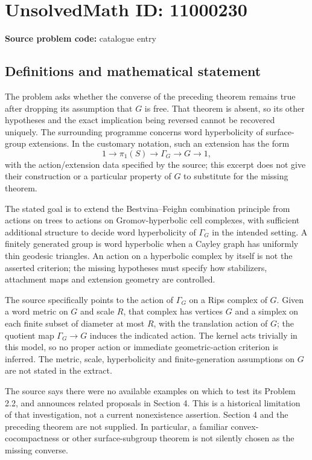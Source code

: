 \documentclass[11pt]{article}
\begin{document}
\section*{UnsolvedMath ID: 11000230}
\textbf{Source problem code:} catalogue entry
\subsection{Definitions and mathematical statement}
The problem asks whether the converse of the preceding theorem remains true after dropping its assumption that \(G\) is free. That theorem is absent, so its other hypotheses and the exact implication being reversed cannot be recovered uniquely. The surrounding programme concerns word hyperbolicity of surface-group extensions. In the customary notation, such an extension has the form
\[1\longrightarrow\pi_1(S)\longrightarrow\Gamma_G\longrightarrow G\longrightarrow1,\]
with the action/extension data specified by the source; this excerpt does not give their construction or a particular property of \(G\) to substitute for the missing theorem.

The stated goal is to extend the Bestvina--Feighn combination principle from actions on trees to actions on Gromov-hyperbolic cell complexes, with sufficient additional structure to decide word hyperbolicity of \(\Gamma_G\) in the intended setting. A finitely generated group is word hyperbolic when a Cayley graph has uniformly thin geodesic triangles. An action on a hyperbolic complex by itself is not the asserted criterion; the missing hypotheses must specify how stabilizers, attachment maps and extension geometry are controlled.

The source specifically points to the action of \(\Gamma_G\) on a Rips complex of \(G\). Given a word metric on \(G\) and scale \(R\), that complex has vertices \(G\) and a simplex on each finite subset of diameter at most \(R\), with the translation action of \(G\); the quotient map \(\Gamma_G\to G\) induces the indicated action. The kernel acts trivially in this model, so no proper action or immediate geometric-action criterion is inferred. The metric, scale, hyperbolicity and finite-generation assumptions on \(G\) are not stated in the extract.

The source says there were no available examples on which to test its Problem 2.2, and announces related proposals in Section 4. This is a historical limitation of that investigation, not a current nonexistence assertion. Section 4 and the preceding theorem are not supplied. In particular, a familiar convex-cocompactness or other surface-subgroup theorem is not silently chosen as the missing converse.
\end{document}
